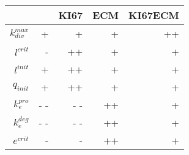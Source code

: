 \begin{tabular}{r| r r r r }
& &KI67 &ECM &KI67ECM \\
\hline 
$k_{div}^{max}$&+ &+ &+ &++ \\
$l^{crit}$&- &++ &+ &+ \\
$l^{init}$&+ &++ &+ &+ \\
$q_{init}$&+ &++ &+ &+ \\
$k_{e}^{pro}$&- - &- - &++ &+ \\
$k_{e}^{deg}$&- - &- - &++ &+ \\
$e^{crit}$&- &- &++ &+ \\
\end{tabular}
